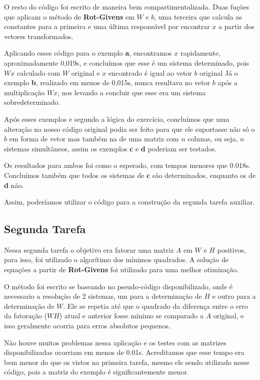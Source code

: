 \documentclass[a4paper, 12pt]{article}
\begin{document}
    O resto do código foi escrito de maneira bem compartimentalizada. Duas fuções que aplicam o método de \textbf{Rot-Givens} em $W$ e $b$, uma terceira que calcula as constantes para a primeira e uma última responsável por encontrar $x$ a partir dos vetores transformados.

    Aplicando esses código para o exemplo \textbf{a}, encontramos $x$ rapidamente, aproximadamente 0,019s, e concluímos que esse é um sistema determinado, pois $Wx$ calculado com  $W$ original e $x$ encontrado é igual ao vetor $b$ original
    Já o exemplo \textbf{b}, realizado em menos de 0,015s, nunca resultava no vetor $b$ após a multiplicação $Wx$, nos levando a concluir que esse era um sistema sobredeterminado.

    Após esses exemplos e segundo a lógica do exercício, concluímos que uma alteração no nosso código original podia ser feito para que ele suportasse não só o $b$ em forma de vetor mas também na de uma matriz com $n$ colunas, ou seja, $n$ sistemas simultâneos, assim os exemplos \textbf{c} e \textbf{d} poderiam ser testados.

    Os resultados para ambos foi como o esperado, com tempos menores que 0.018s.
    Concluímos também que todos os sistemas de  \textbf{c} são determinados, enquanto os de  \textbf{d} não.

    Assim, poderíamos utilizar o código para a construção da segunda tarefa auxiliar.

\subsection{Segunda Tarefa}

    Nessa segunda tarefa o objetivo era fatorar uma matriz $A$ em $W$ e  $H$ positivos, para isso, foi utilizado o algorítimo dos mínimos quadrados.
    A solução de equações a partir de \textbf{Rot-Givens} foi utilizado para uma melhor otimização.

    O método foi escrito se baseando no pseudo-código disponibilizado, onde é necessario a resolução de 2 sistemas, um para a determinação de $H$ e outro para a determinação de $W$.
    Ele se repetia até que o quadrado da diferença entre o erro da fatoração ($WH$) atual e anterior fosse mínimo se comparado a $A$ original, e isso geralmente ocorria para erros absolutos pequenos.

    Não houve muitos problemas nessa aplicação e os testes com as matrizes disponibilizadas ocorriam em menos de 0.01s.
    Acreditamos que esse tempo era bem menor do que os vistos na primeira tarefa, mesmo ele sendo utilizado nesse código, pois a matriz do exemplo é significantemente menor.
\end{document}
